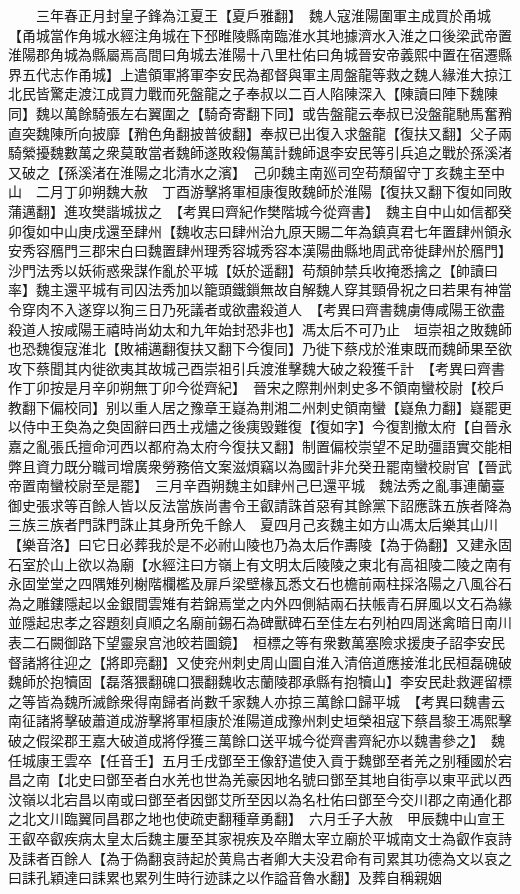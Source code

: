 　　三年春正月封皇子鋒為江夏王【夏戶雅翻】　魏人寇淮陽圍軍主成買於甬城【甬城當作角城水經注角城在下邳睢陵縣南臨淮水其地據濟水入淮之口後梁武帝置淮陽郡角城為縣屬焉高間曰角城去淮陽十八里杜佑曰角城晉安帝義熙中置在宿遷縣界五代志作甬城】上遣領軍將軍李安民為都督與軍主周盤龍等救之魏人緣淮大掠江北民皆驚走渡江成買力戰而死盤龍之子奉叔以二百人陷陳深入【陳讀曰陣下魏陳同】魏以萬餘騎張左右翼圍之【騎奇寄翻下同】或告盤龍云奉叔已没盤龍馳馬奮矟直突魏陳所向披靡【矟色角翻披普彼翻】奉叔已出復入求盤龍【復扶又翻】父子兩騎縈擾魏數萬之衆莫敢當者魏師遂敗殺傷萬計魏師退李安民等引兵追之戰於孫溪渚又破之【孫溪渚在淮陽之北清水之濱】　己卯魏主南廵司空苟頹留守丁亥魏主至中山　二月丁卯朔魏大赦　丁酉游擊將軍桓康復敗魏師於淮陽【復扶又翻下復如同敗蒲邁翻】進攻樊諧城拔之　【考異曰齊紀作樊階城今從齊書】　魏主自中山如信都癸卯復如中山庚戌還至肆州【魏收志曰肆州治九原天賜二年為鎮真君七年置肆州領永安秀容鴈門三郡宋白曰魏置肆州理秀容城秀容本漢陽曲縣地周武帝徙肆州於鴈門】沙門法秀以妖術惑衆謀作亂於平城【妖於遥翻】苟頹帥禁兵收掩悉擒之【帥讀曰率】魏主還平城有司囚法秀加以籠頭鐵鎻無故自解魏人穿其頸骨祝之曰若果有神當令穿肉不入遂穿以狥三日乃死議者或欲盡殺道人　【考異曰齊書魏虜傳咸陽王欲盡殺道人按咸陽王禧時尚幼太和九年始封恐非也】馮太后不可乃止　垣崇祖之敗魏師也恐魏復寇淮北【敗補邁翻復扶又翻下今復同】乃徙下蔡戍於淮東既而魏師果至欲攻下蔡聞其内徙欲夷其故城己酉崇祖引兵渡淮擊魏大破之殺獲千計　【考異曰齊書作丁卯按是月辛卯朔無丁卯今從齊紀】　晉宋之際荆州刺史多不領南蠻校尉【校戶教翻下偏校同】别以重人居之豫章王嶷為荆湘二州刺史領南蠻【嶷魚力翻】嶷罷更以侍中王奐為之奐固辭曰西土戎燼之後痍毁難復【復如字】今復割撤太府【自晉永嘉之亂張氏擅命河西以都府為太府今復扶又翻】制置偏校崇望不足助彊語實交能相弊且資力既分職司增廣衆勞務倍文案滋煩竊以為國計非允癸丑罷南蠻校尉官【晉武帝置南蠻校尉至是罷】　三月辛酉朔魏主如肆州己巳還平城　魏法秀之亂事連蘭臺御史張求等百餘人皆以反法當族尚書令王叡請誅首惡宥其餘黨下詔應誅五族者降為三族三族者門誅門誅止其身所免千餘人　夏四月己亥魏主如方山馮太后樂其山川【樂音洛】曰它日必葬我於是不必祔山陵也乃為太后作夀陵【為于偽翻】又建永固石室於山上欲以為廟【水經注曰方嶺上有文明太后陵陵之東北有高祖陵二陵之南有永固堂堂之四隅雉列榭階欄檻及扉戶梁壁椽瓦悉文石也檐前兩柱採洛陽之八風谷石為之雕鏤隱起以金銀間雲雉有若錦焉堂之内外四側結兩石扶帳青石屏風以文石為緣並隱起忠孝之容題刻貞順之名廟前錫石為碑獸碑石至佳左右列柏四周迷禽暗日南川表二石闕御路下望靈泉宫池皎若圖鏡】　桓標之等有衆數萬塞險求援庚子詔李安民督諸將往迎之【將即亮翻】又使兖州刺史周山圖自淮入清倍道應接淮北民桓磊磈破魏師於抱犢固【磊落猥翻磈口猥翻魏收志蘭陵郡承縣有抱犢山】李安民赴救遲留標之等皆為魏所滅餘衆得南歸者尚數千家魏人亦掠三萬餘口歸平城　【考異曰魏書云南征諸將擊破蕭道成游擊將軍桓康於淮陽道成豫州刺史垣榮祖寇下蔡昌黎王馮熙擊破之假梁郡王嘉大破道成將俘獲三萬餘口送平城今從齊書齊紀亦以魏書參之】　魏任城康王雲卒【任音壬】五月壬戌鄧至王像舒遣使入貢于魏鄧至者羌之别種國於宕昌之南【北史曰鄧至者白水羌也世為羌豪因地名號曰鄧至其地自街亭以東平武以西汶嶺以北宕昌以南或曰鄧至者因鄧艾所至因以為名杜佑曰鄧至今交川郡之南通化郡之北文川臨翼同昌郡之地也使疏吏翻種章勇翻】　六月壬子大赦　甲辰魏中山宣王王叡卒叡疾病太皇太后魏主屢至其家視疾及卒贈太宰立廟於平城南文士為叡作哀詩及誄者百餘人【為于偽翻哀詩起於黄鳥古者卿大夫没君命有司累其功德為文以哀之曰誄孔穎達曰誄累也累列生時行迹誄之以作謚音魯水翻】及葬自稱親姻